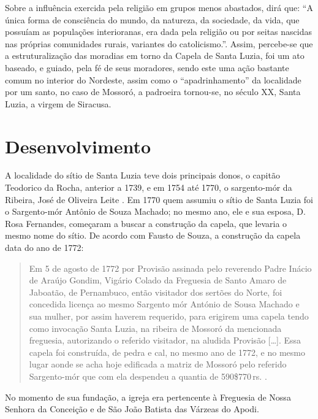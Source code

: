 \begin{refsection}
    Sobre a influência exercida pela religião em grupos menos abastados, \textcite[p.~9]{Faco1972Cangaceiros} dirá que: ``A única forma de consciência do mundo, da natureza, da sociedade, da vida, que possuíam as populações interioranas, era dada pela religião ou por seitas nascidas nas próprias comunidades rurais, variantes do catolicismo.''. Assim, percebe-se que a estruturalização das moradias em torno da Capela de Santa Luzia, foi um ato baseado, e guiado, pela fé de seus moradores, sendo este uma ação bastante comum no interior do Nordeste, assim como o ``apadrinhamento'' da localidade por um santo, no caso de Mossoró, a padroeira tornou-se, no século XX, Santa Luzia, a virgem de Siracusa.

    \section{Desenvolvimento}

    A localidade do sítio de Santa Luzia teve dois principais donos, o capitão Teodorico da Rocha, anterior a 1739, e em 1754 até 1770, o sargento-mór da Ribeira, José de Oliveira Leite \cite[p.~53]{Souza2010Historia}. Em 1770 quem assumiu o sítio de Santa Luzia foi o Sargento-mór Antônio de Souza Machado; no mesmo ano, ele e sua esposa, D. Rosa Fernandes, começaram a buscar a construção da capela, que levaria o mesmo nome do sítio. De acordo com Fausto de Souza, a construção da capela data do ano de 1772:

    \begin{quotation}
        Em 5 de agosto de 1772 por Provisão assinada pelo reverendo Padre Inácio de Araújo Gondim, Vigário Colado da Freguesia de Santo Amaro de Jaboatão, de Pernambuco, então visitador dos sertões do Norte, foi concedida licença ao mesmo Sargento mór António de Sousa Machado e sua mulher, por assim haverem requerido, para erigirem uma capela tendo como invocação Santa Luzia, na ribeira de Mossoró da mencionada freguesia, autorizando o referido visitador, na aludida Provisão [\dots]. Essa capela foi construída, de pedra e cal, no mesmo ano de 1772, e no mesmo lugar aonde se acha hoje edificada a matriz de Mossoró pelo referido Sargento-mór que com ela despendeu a quantia de 590\$770\,{}rs. \cite[p.~54]{Souza2010Historia}.
    \end{quotation}

    No momento de sua fundação, a igreja era pertencente à Freguesia de Nossa Senhora da Conceição e de São João Batista das Várzeas do Apodi. 


\end{refsection}
